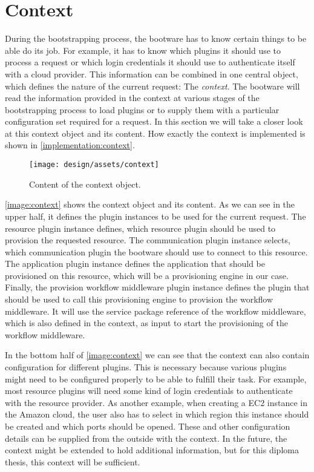 \section{Context}
\label{design:context}

During the bootstrapping process, the bootware has to know certain things to be able do its job.
For example, it has to know which plugins it should use to process a request or which login credentials it should use to authenticate itself with a cloud provider.
This information can be combined in one central object, which defines the nature of the current request: The \textit{context}.
The bootware will read the information provided in the context at various stages of the bootstrapping process to load plugins or to supply them with a particular configuration set required for a request.
In this section we will take a closer look at this context object and its content.
How exactly the context is implemented is shown in \autoref{implementation:context}.

\begin{figure}[!htbp]
	\centering
	\texttt{[image: design/assets/context]}
	\caption{Content of the context object.}
	\label{image:context}
\end{figure}

\autoref{image:context} shows the context object and its content.
As we can see in the upper half, it defines the plugin instances to be used for the current request.
The resource plugin instance defines, which resource plugin should be used to provision the requested resource.
The communication plugin instance selects, which communication plugin the bootware should use to connect to this resource.
The application plugin instance defines the application that should be provisioned on this resource, which will be a provisioning engine in our case.
Finally, the provision workflow middleware plugin instance defines the plugin that should be used to call this provisioning engine to provision the workflow middleware.
It will use the service package reference of the workflow middleware, which is also defined in the context, as input to start the provisioning of the workflow middleware.

In the bottom half of \autoref{image:context} we can see that the context can also contain configuration for different plugins.
This is necessary because various plugins might need to be configured properly to be able to fulfill their task.
For example, most resource plugins will need some kind of login credentials to authenticate with the resource provider.
As another example, when creating a EC2 instance in the Amazon cloud, the user also has to select in which region this instance should be created and which ports should be opened.
These and other configuration details can be supplied from the outside with the context.
In the future, the context might be extended to hold additional information, but for this diploma thesis, this context will be sufficient.

